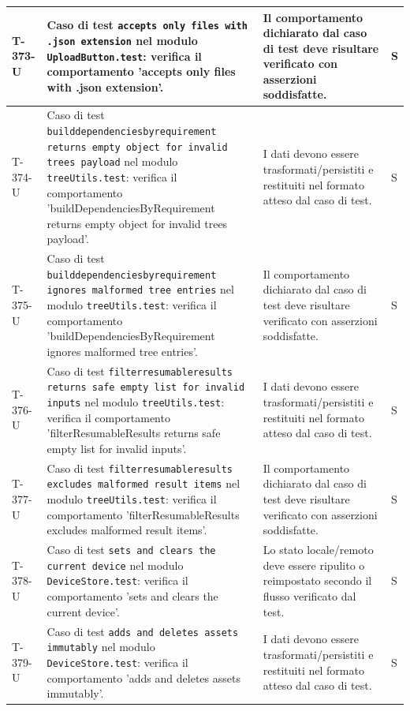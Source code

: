 \documentclass[a4paper,12pt]{article}
\begin{document}
{{\begin{longtable}{|>{\RaggedRight\arraybackslash}p{1.55cm}|>{\RaggedRight\arraybackslash}p{8.0cm}|>{\RaggedRight\arraybackslash}p{4.6cm}|>{\RaggedRight\arraybackslash}p{1.2cm}|}
        \hline
        T-373-U & Caso di test \texttt{accepts only files with .json extension} nel modulo \texttt{UploadButton.test}: verifica il comportamento 'accepts only files with .json extension'. & Il comportamento dichiarato dal caso di test deve risultare verificato con asserzioni soddisfatte. & S \\
        \hline
        T-374-U & Caso di test \texttt{builddependenciesbyrequirement returns empty object for invalid trees payload} nel modulo \texttt{treeUtils.test}: verifica il comportamento 'buildDependenciesByRequirement returns empty object for invalid trees payload'. & I dati devono essere trasformati/persistiti e restituiti nel formato atteso dal caso di test. & S \\
        \hline
        T-375-U & Caso di test \texttt{builddependenciesbyrequirement ignores malformed tree entries} nel modulo \texttt{treeUtils.test}: verifica il comportamento 'buildDependenciesByRequirement ignores malformed tree entries'. & Il comportamento dichiarato dal caso di test deve risultare verificato con asserzioni soddisfatte. & S \\
        \hline
        T-376-U & Caso di test \texttt{filterresumableresults returns safe empty list for invalid inputs} nel modulo \texttt{treeUtils.test}: verifica il comportamento 'filterResumableResults returns safe empty list for invalid inputs'. & I dati devono essere trasformati/persistiti e restituiti nel formato atteso dal caso di test. & S \\
        \hline
        T-377-U & Caso di test \texttt{filterresumableresults excludes malformed result items} nel modulo \texttt{treeUtils.test}: verifica il comportamento 'filterResumableResults excludes malformed result items'. & Il comportamento dichiarato dal caso di test deve risultare verificato con asserzioni soddisfatte. & S \\
        \hline
        T-378-U & Caso di test \texttt{sets and clears the current device} nel modulo \texttt{DeviceStore.test}: verifica il comportamento 'sets and clears the current device'. & Lo stato locale/remoto deve essere ripulito o reimpostato secondo il flusso verificato dal test. & S \\
        \hline
        T-379-U & Caso di test \texttt{adds and deletes assets immutably} nel modulo \texttt{DeviceStore.test}: verifica il comportamento 'adds and deletes assets immutably'. & I dati devono essere trasformati/persistiti e restituiti nel formato atteso dal caso di test. & S \\

\end{longtable}}}
\end{document}
